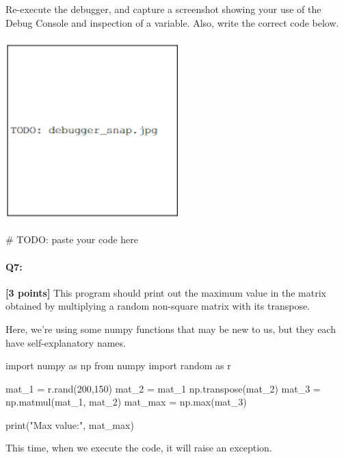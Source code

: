\documentclass[11pt]{article}
\begin{document}
\begin{tcolorbox}[colback=orange!5!white,colframe=orange!75!black,enhanced jigsaw,breakable,pad at break*=1mm]
Re-execute the debugger, and capture a screenshot showing your use of the Debug Console and inspection of a variable. Also, write the correct code below.
\end{tcolorbox}

\begin{tcolorbox}[colback=white!5!white,colframe=green!75!black,height=8cm,height fill]
    \includegraphics[width=0.5\textwidth,height=7cm,keepaspectratio]{images/TODO_debugger_snap.jpg}
    
    \begin{python}
    # TODO: paste your code here 
    \end{python}
\end{tcolorbox}



\pagebreak
\paragraph{Q7:} \textbf{[3 points]} This program should print out the maximum value in the matrix obtained by multiplying a random non-square matrix with its transpose.

Here, we're using some numpy functions that may be new to us, but they each have self-explanatory names.

\begin{python}
import numpy as np
from numpy import random as r

mat_1 = r.rand(200,150)
mat_2 = mat_1
np.transpose(mat_2)
mat_3 = np.matmul(mat_1, mat_2)
mat_max = np.max(mat_3)

print("Max value:", mat_max)
\end{python}

This time, when we execute the code, it will raise an exception.
\end{document}
